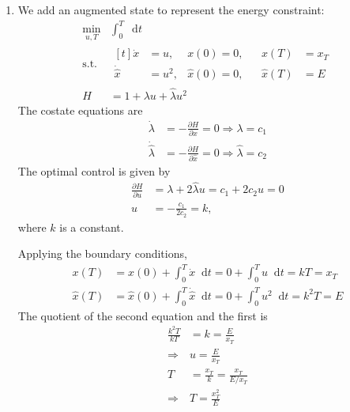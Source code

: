 \documentclass[letterpaper,11pt,titlepage]{article}
\newcommand*\dif{\mathop{}\!\mathrm{d}}
\newcommand*\pder[2]{\frac{\partial #1}{\partial #2}}
\begin{document}
\begin{enumerate}[leftmargin=0pt]
    \item We add an augmented state to represent the energy constraint:
        \begin{align}
            \min_{u,T} {} & \int_0^T\!\dif t \\
            \text{s.t. } &
            \begin{aligned}[t]
                \dot x &= u, & x(0) = 0, && x(T) &= x_T \\
                \dot{\hat x} &= u^2, & \hat x(0) = 0, && \hat x(T) &= E
            \end{aligned} \\
            H &= 1 + \lambda u + \widehat\lambda u^2
        \end{align}
        The costate equations are
        \begin{align}
            \dot\lambda &= -\pder{H}{x} = 0 \Rightarrow \lambda = c_1 \\
            \dot{\widehat\lambda} &= -\pder{H}{\hat x} = 0 \Rightarrow \widehat\lambda = c_2
        \end{align}
        The optimal control is given by
        \begin{align}
            \pder{H}{u} &= \lambda + 2\widehat\lambda u = c_1 + 2c_2 u = 0 \\
            u &= -\frac{c_1}{2c_2} = k,
        \end{align}
        where $k$ is a constant.

        Applying the boundary conditions,
        \begin{align}
            x(T) &= x(0) + \int_0^T \dot x\dif t = 0 + \int_0^T u\dif t = kT = x_T \\
            \hat x(T) &= \hat x(0) + \int_0^T \dot{\hat x}\dif t = 0 + \int_0^T u^2 \dif t = k^2 T = E
        \end{align}
        The quotient of the second equation and the first is
        \begin{align}
            \frac{k^2 T}{kT} &= k = \frac{E}{x_T} \\
            \Rightarrow & \boxed{u=\frac{E}{x_T}} \\
            T &= \frac{x_T}{k} = \frac{x_T}{E/x_T} \\
            \Rightarrow & \boxed{T = \frac{x_T^2}{E}}
        \end{align}


\end{enumerate}
\end{document}
